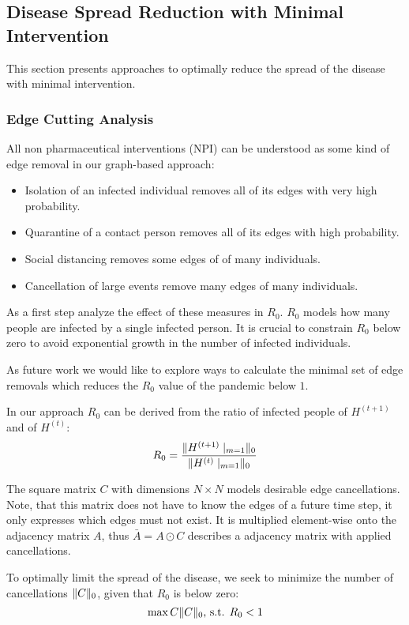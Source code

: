 \documentclass[]{article}
\DeclarePairedDelimiter\norm{\lVert}{\rVert}%
\begin{document}
\subsection{Disease Spread Reduction with Minimal Intervention}
This section presents approaches to optimally reduce the spread of the disease with minimal intervention.

\subsubsection{Edge Cutting Analysis}
All non pharmaceutical interventions (NPI) can be understood as some kind of edge removal in our graph-based approach:
\begin{itemize}
	\item Isolation of an infected individual removes all of its edges with very high probability.
	\item Quarantine of a contact person removes all of its edges with high probability.
	\item Social distancing removes some edges of of many individuals.
	\item Cancellation of large events remove many edges of many individuals.
\end{itemize}
As a first step analyze the effect of these measures in $R_0$.
$R_0$ models how many people are infected by a single infected person.
It is crucial to constrain $R_0$ below zero to avoid exponential growth in the number of infected individuals.


As future work we would like to explore ways to calculate the minimal set of edge removals which reduces the $R_0$ value of the pandemic below $1$.

In our approach $R_0$ can be derived from the ratio of infected people of $H^{(t+1)}$ and of $H^{(t)}$:
\begin{equation}
	R_0 = \frac{\norm{H^{(t+1)}\mid_{m=1}}_{0}}{\norm{H^{(t)}\mid_{m=1}}_{0}} %
\end{equation}

The square matrix $C$ with dimensions $N \times N$ models desirable edge cancellations.
Note, that this matrix does not have to know the edges of a future time step, it only expresses which edges must not exist.
It is multiplied element-wise onto the adjacency matrix $A$, thus $\bar{A} = A \odot C$ describes a adjacency matrix with applied cancellations.

To optimally limit the spread of the disease, we seek to minimize the number of cancellations $\norm{C}_0$, given that $R_0$ is below zero:
\begin{equation}
	\max{C} \norm{C}_0\text{, s.t. }R_0 < 1
\end{equation}
\end{document}
